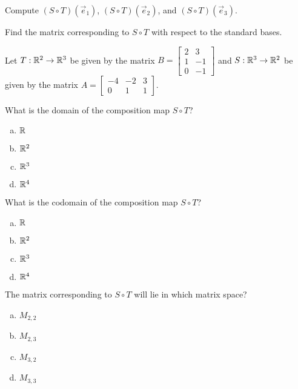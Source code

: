 \begin{applicationActivities}{1}{22}
\begin{activity}{0}
Compute $(S \circ T)(\vec{e}_1)$, $(S \circ T)(\vec{e}_2)$, and
$(S \circ T)(\vec{e}_3)$.
\end{activity}

\begin{activity}{0}
Find the matrix corresponding to $S \circ T$ with respect to the standard bases.
\end{activity}

\begin{activity}{0}
Let $T: \mathbb{R}^2 \rightarrow \mathbb{R}^3$ be given by the matrix $B=\begin{bmatrix} 2 & 3 \\ 1 & -1 \\ 0 & -1 \end{bmatrix}$ and $S: \mathbb{R}^3 \rightarrow \mathbb{R}^2$ be given by the matrix $A=\begin{bmatrix} -4 & -2 & 3 \\ 0 & 1 & 1 \end{bmatrix}$.

What is the domain of the composition map $S \circ T$?
\begin{enumerate}[(a)]
\item $\mathbb{R}$
\item $\mathbb{R}^2$
\item $\mathbb{R}^3$
\item $\mathbb{R}^4$
\end{enumerate}
\end{activity}

\begin{activity}{0}
What is the codomain of the composition map $S \circ T$?
\begin{enumerate}[(a)]
\item $\mathbb{R}$
\item $\mathbb{R}^2$
\item $\mathbb{R}^3$
\item $\mathbb{R}^4$
\end{enumerate}
\end{activity}

\begin{activity}{0}
The matrix corresponding to $S \circ T$ will lie in which matrix space?
\begin{enumerate}[(a)]
\item $M_{2,2}$
\item $M_{2,3}$
\item $M_{3,2}$
\item $M_{3,3}$
\end{enumerate}
\end{activity}


\end{applicationActivities}
